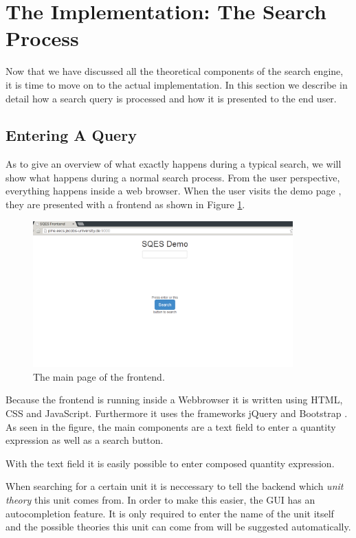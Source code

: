 \section{The Implementation: The Search Process}
\label{sec:pit}

Now that we have discussed all the theoretical components of the search engine, it is time to move on to the actual implementation. In this section we describe in detail how a search query is processed and how it is presented to the end user.

\subsection{Entering A Query}

As to give an overview of what exactly happens during a typical search, we will show what happens during a normal search process. From the user perspective, everything happens inside a web browser. When the user visits the demo page \cite{self:sqesdemo}, they are presented with a frontend as shown in Figure \ref{fig:frontmain}.

\begin{figure}[h]
  \begin{center}
    \includegraphics[width=100mm]{img/screen1.png}
  \end{center}
  \caption{The main page of the frontend. }
  \label{fig:frontmain}
\end{figure}

Because the frontend is running inside a Webbrowser it is written using HTML, CSS and JavaScript. Furthermore it uses the frameworks jQuery \cite{lib:jquery} and Bootstrap \cite{lib:bootstrap}. As seen in the figure, the main components are a text field to enter a quantity expression as well as a search button.

With the text field it is easily possible to enter composed quantity expression.

When searching for a certain unit it is neccessary to tell the backend which \textit{unit theory} this unit comes from. In order to make this easier, the GUI has an autocompletion feature. It is only required to enter the name of the unit itself and the possible theories this unit can come from will be suggested automatically.

